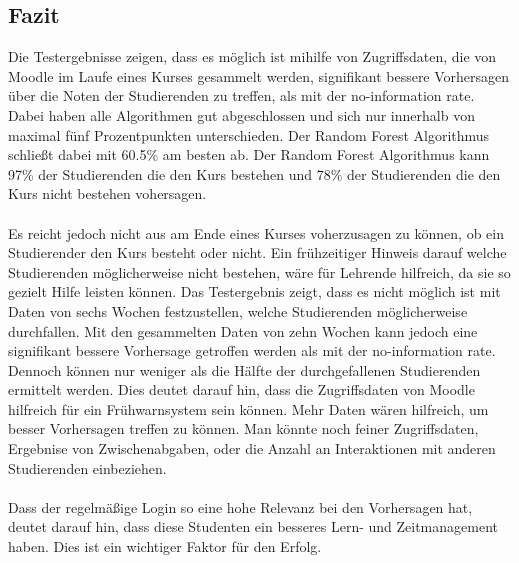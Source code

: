 \subsection{Fazit}
Die Testergebnisse zeigen, dass es möglich ist mihilfe von Zugriffsdaten, die von Moodle im Laufe eines Kurses gesammelt werden, signifikant bessere Vorhersagen über die Noten der Studierenden zu treffen, als mit der \glqq no-information rate\grqq{}.
Dabei haben alle Algorithmen gut abgeschlossen und sich nur innerhalb von maximal fünf Prozentpunkten unterschieden. Der Random Forest Algorithmus schließt dabei mit 60.5\% am besten ab.
Der Random Forest Algorithmus kann 97\% der Studierenden die den Kurs bestehen und 78\% der Studierenden die den Kurs nicht bestehen vohersagen. \cite[S. 14]{Quinn.2020}
\\ \noindent \\ \noindent
Es reicht jedoch nicht aus am Ende eines Kurses voherzusagen zu können, ob ein Studierender den Kurs besteht oder nicht.
Ein frühzeitiger Hinweis darauf welche Studierenden möglicherweise nicht bestehen, wäre für Lehrende hilfreich, da sie so gezielt Hilfe leisten können.
Das Testergebnis zeigt, dass es nicht möglich ist mit Daten von sechs Wochen festzustellen, welche Studierenden möglicherweise durchfallen.
Mit den gesammelten Daten von zehn Wochen kann jedoch eine signifikant bessere Vorhersage getroffen werden als mit der \glqq no-information rate\grqq{}.
Dennoch können nur weniger als die Hälfte der durchgefallenen Studierenden ermittelt werden.
Dies deutet darauf hin, dass die Zugriffsdaten von Moodle hilfreich für ein Frühwarnsystem sein können.
Mehr Daten wären hilfreich, um besser Vorhersagen treffen zu können. Man könnte noch feiner Zugriffsdaten, Ergebnise von Zwischenabgaben, oder die Anzahl an Interaktionen mit anderen Studierenden einbeziehen. \cite[S. 14ff]{Quinn.2020}
\\ \\ \noindent
Dass der regelmäßige Login so eine hohe Relevanz bei den Vorhersagen hat, deutet darauf hin, dass diese Studenten ein besseres Lern- und Zeitmanagement haben. Dies ist ein wichtiger Faktor für den Erfolg. \cite[S. 15f]{Quinn.2020}